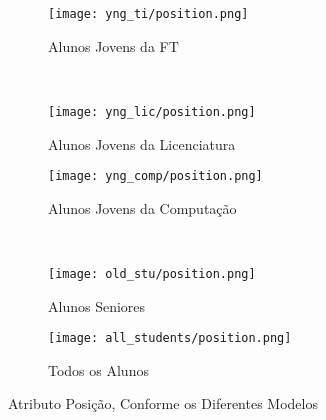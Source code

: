 \clearpage
\begin{figure}[!ht]
    \centering
    \begin{subfigure}[b]{0.48\textwidth}
        \centering
        \texttt{[image: yng\_ti/position.png]}
        \caption{Alunos Jovens da FT}
    \end{subfigure}
    ~
    \begin{subfigure}[b]{0.48\textwidth}
        \centering
        \texttt{[image: yng\_lic/position.png]}
        \caption{Alunos Jovens da Licenciatura}
    \end{subfigure}

    \begin{subfigure}[b]{0.48\textwidth}
        \centering
        \texttt{[image: yng\_comp/position.png]}
        \caption{Alunos Jovens da Computação}
    \end{subfigure}
    ~
    \begin{subfigure}[b]{0.48\textwidth}
        \centering
        \texttt{[image: old\_stu/position.png]}
        \caption{Alunos Seniores}
    \end{subfigure}

    \begin{subfigure}[b]{0.48\textwidth}
        \centering
        \texttt{[image: all\_students/position.png]}
        \caption{Todos os Alunos}
    \end{subfigure}
    \caption{Atributo Posição, Conforme os Diferentes Modelos}
\end{figure}

